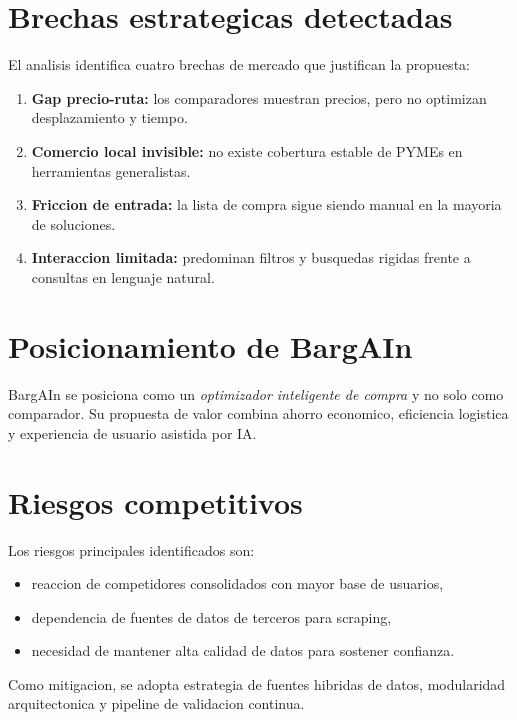 \section{Brechas estrategicas detectadas}

El analisis identifica cuatro brechas de mercado que justifican la propuesta:

\begin{enumerate}
	\item \textbf{Gap precio-ruta:} los comparadores muestran precios, pero no optimizan
		desplazamiento y tiempo.
	\item \textbf{Comercio local invisible:} no existe cobertura estable de PYMEs en
		herramientas generalistas.
	\item \textbf{Friccion de entrada:} la lista de compra sigue siendo manual en la mayoria
		de soluciones.
	\item \textbf{Interaccion limitada:} predominan filtros y busquedas rigidas frente a
		consultas en lenguaje natural.
\end{enumerate}

\section{Posicionamiento de BargAIn}

BargAIn se posiciona como un \emph{optimizador inteligente de compra} y no solo como
comparador. Su propuesta de valor combina ahorro economico, eficiencia logistica y
experiencia de usuario asistida por IA.

\section{Riesgos competitivos}

Los riesgos principales identificados son:

\begin{itemize}
	\item reaccion de competidores consolidados con mayor base de usuarios,
	\item dependencia de fuentes de datos de terceros para scraping,
	\item necesidad de mantener alta calidad de datos para sostener confianza.
\end{itemize}

Como mitigacion, se adopta estrategia de fuentes hibridas de datos, modularidad
arquitectonica y pipeline de validacion continua.
	 




























